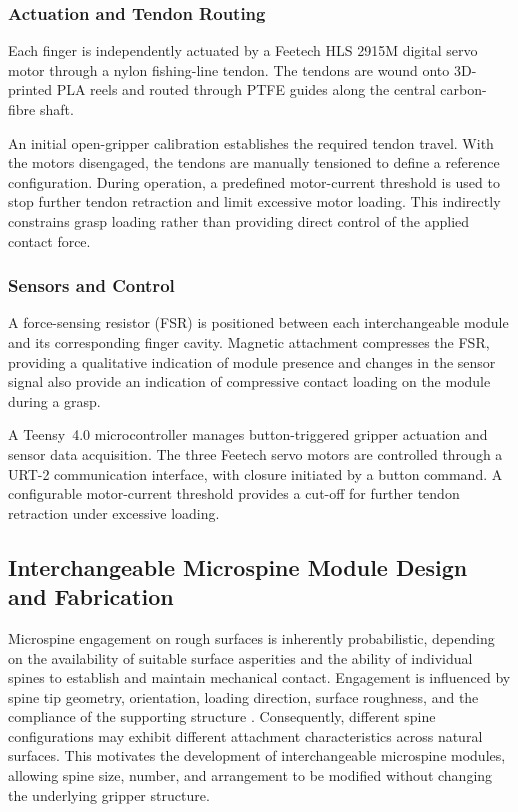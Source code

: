 \documentclass[letterpaper, 10 pt, conference, twoside]{ieeetran}
\begin{document}
\subsubsection{Actuation and Tendon Routing}

Each finger is independently actuated by a Feetech
HLS 2915M digital servo motor through a nylon fishing-line tendon. The tendons are wound onto 3D-printed PLA reels and routed through PTFE guides along the central
carbon-fibre shaft.

An initial open-gripper calibration establishes the required tendon travel. With the motors disengaged, the tendons are manually tensioned to define a reference configuration. During operation, a predefined motor-current threshold is used to stop further tendon retraction and limit excessive motor loading. This indirectly constrains grasp loading rather than providing direct control of the applied contact force.

\subsubsection{Sensors and Control}

A force-sensing resistor (FSR) is positioned between each interchangeable module and its corresponding finger cavity. Magnetic attachment compresses the FSR, providing a qualitative indication of module presence and changes in the sensor signal  also provide an indication of compressive contact loading on the module during a grasp.

A Teensy~4.0 microcontroller manages button-triggered gripper actuation and sensor data acquisition. The three Feetech servo motors are controlled through a URT-2 communication interface, with closure initiated by a button command. A configurable motor-current threshold provides a cut-off for further tendon retraction under excessive loading.


\subsection{Interchangeable Microspine Module Design
and Fabrication}

Microspine engagement on rough surfaces is inherently probabilistic, depending on the availability of suitable surface asperities and the ability of individual spines to establish and maintain mechanical contact. Engagement is influenced by spine tip geometry, orientation, loading direction, surface roughness, and the compliance of the supporting structure \cite{Jiang2018StochasticModels,Asbeck2006IJRR}. Consequently, different spine configurations may exhibit different attachment characteristics across natural surfaces. This motivates the development of interchangeable microspine modules, allowing spine size, number, and arrangement to be modified without changing the underlying gripper structure.
\end{document}
